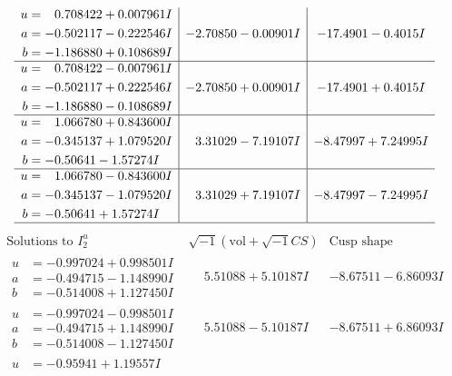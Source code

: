 \documentclass[1p]{elsarticle_modified}
\theoremstyle{definition}
\newcommand{\I}{\sqrt{-1}}
\begin{document}
$$\begin{array}{c|c|c}
\begin{aligned}
u &= \phantom{-}0.708422 + 0.007961 I \\
a &= -0.502117 - 0.222546 I \\
b &= -1.186880 + 0.108689 I\end{aligned}
 & -2.70850 - 0.00901 I & -17.4901 - 0.4015 I \\ \hline\begin{aligned}
u &= \phantom{-}0.708422 - 0.007961 I \\
a &= -0.502117 + 0.222546 I \\
b &= -1.186880 - 0.108689 I\end{aligned}
 & -2.70850 + 0.00901 I & -17.4901 + 0.4015 I \\ \hline\begin{aligned}
u &= \phantom{-}1.066780 + 0.843600 I \\
a &= -0.345137 + 1.079520 I \\
b &= -0.50641 - 1.57274 I\end{aligned}
 & \phantom{-}3.31029 - 7.19107 I & -8.47997 + 7.24995 I \\ \hline\begin{aligned}
u &= \phantom{-}1.066780 - 0.843600 I \\
a &= -0.345137 - 1.079520 I \\
b &= -0.50641 + 1.57274 I\end{aligned}
 & \phantom{-}3.31029 + 7.19107 I & -8.47997 - 7.24995 I\\
 \hline 
 \end{array}$$\newpage$$\begin{array}{c|c|c}  
\text{Solutions to }I^u_{2}& \I (\text{vol} + \sqrt{-1}CS) & \text{Cusp shape}\\
 \hline 
\begin{aligned}
u &= -0.997024 + 0.998501 I \\
a &= -0.494715 - 1.148990 I \\
b &= -0.514008 + 1.127450 I\end{aligned}
 & \phantom{-}5.51088 + 5.10187 I & -8.67511 - 6.86093 I \\ \hline\begin{aligned}
u &= -0.997024 - 0.998501 I \\
a &= -0.494715 + 1.148990 I \\
b &= -0.514008 - 1.127450 I\end{aligned}
 & \phantom{-}5.51088 - 5.10187 I & -8.67511 + 6.86093 I \\ \hline\begin{aligned}
u &= -0.95941 + 1.19557 I \\

\end{aligned}
\end{array}$$
\end{document}
